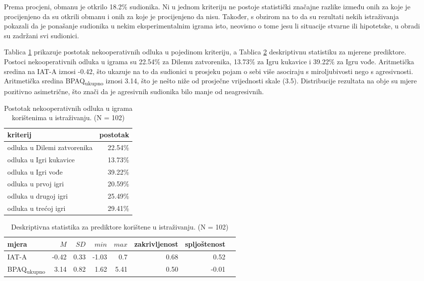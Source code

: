 \documentclass[a4paper, 12pt]{report}
\begin{document}
Prema procjeni, obmanu je otkrilo 18.2\% sudionika. 
Ni u jednom kriteriju ne postoje statistički značajne
razlike između onih za koje je procijenjeno da su otkrili obmanu i onih za koje
je procijenjeno da nisu.
Također, s obzirom na to da su rezultati nekih istraživanja
\citep{ben2008economic} pokazali da je ponašanje sudionika u nekim
eksperimentalnim igrama isto, neovisno o tome jesu li situacije stvarne ili
hipotetske, u obradi su zadržani svi sudionici.

Tablica \ref{deskr krit} prikazuje postotak nekooperativnih odluka u
pojedinom kriteriju, a Tablica \ref{deskr pred} deskriptivnu statistiku za mjerene
prediktore.
Postoci nekooperativnih odluka u igrama su 22.54\% za Dilemu zatvorenika, 13.73\% za Igru
kukavice  i 39.22\% za Igru vođe. 
Aritmetička sredina na IAT-A iznosi -0.42, što ukazuje na
to da sudionici u prosjeku pojam o sebi više asociraju s miroljubivosti
nego s agresivnosti. 
Aritmetička sredina BPAQ\textsubscript{ukupno} iznosi 3.14, što je nešto niže od
prosječne vrijednosti skale (3.5).
Distribucije rezultata na obje su mjere pozitivno
asimetrične, što znači da je agresivnih sudionika bilo manje od neagresivnih.

\begin{table}[h]
    \caption{Postotak nekooperativnih odluka u igrama korištenima u istraživanju. (N =
        102)\label{deskr krit}}
    \centering
    \begin{tabular}{l*{1}{r}}
        \toprule
        kriterij & postotak\\
        \midrule
        odluka u Dilemi zatvorenika & 22.54\% \\
        odluka u Igri kukavice & 13.73\% \\
        odluka u Igri vođe & 39.22\% \\
        odluka u prvoj igri & 20.59\% \\
        odluka u drugoj igri & 25.49\% \\
        odluka u trećoj igri & 29.41\% \\
        \bottomrule
    \end{tabular}
\end{table}

\begin{table}[h]
    \caption{Deskriptivna statistika za prediktore korištene u 
        istraživanju. (N = 102)\label{deskr pred}}
    \centering
    \begin{tabular}{l*{7}{r}}
        \toprule
        mjera & $M$ & $SD$ & $min$ & $max$ & zakrivljenost & spljoštenost\\
        \midrule
        IAT-A & -0.42 & 0.33 & -1.03 & 0.7 & 0.68 & 0.52\\
        BPAQ\textsubscript{ukupno} & 3.14 & 0.82 & 1.62 & 5.41 & 0.50 & -0.01\\
        \bottomrule
    \end{tabular}
\end{table}
\end{document}
